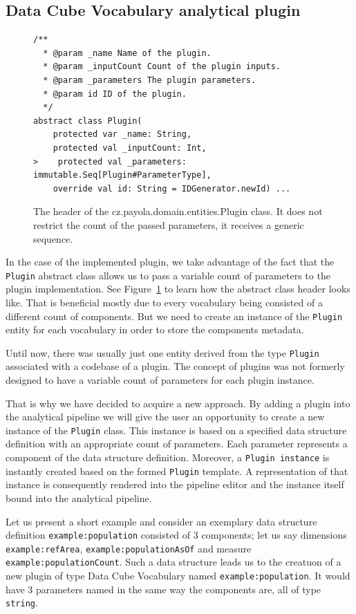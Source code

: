 \subsection{Data Cube Vocabulary analytical plugin}

\begin{figure}
  \begin{verbatim}
/**
  * @param _name Name of the plugin.
  * @param _inputCount Count of the plugin inputs.
  * @param _parameters The plugin parameters.
  * @param id ID of the plugin.
  */
abstract class Plugin(
    protected var _name: String,
    protected val _inputCount: Int,
>    protected val _parameters: immutable.Seq[Plugin#ParameterType],
    override val id: String = IDGenerator.newId) ...
  \end{verbatim}
  \label{fig:plugin-trait}
  \caption{The header of the cz.payola.domain.entities.Plugin class. It does not restrict the count
  of the passed parameters, it receives a generic sequence.}
\end{figure}

In the case of the implemented plugin, we take advantage of the fact that the 
\texttt{Plugin} abstract class allows us to pass a variable count of parameters to the 
plugin implementation. See Figure~\ref{fig:plugin-trait} to learn how the abstract class header 
looks like. That is beneficial mostly due to every vocabulary being consisted of a 
different count of components. But we need to create an instance of the \texttt{Plugin} entity
for each vocabulary in order to store the components metadata.

Until now, there was usually just one entity derived from the type \texttt{Plugin} associated with
a codebase of a plugin. The concept of plugins was not formerly designed to have
a variable count of parameters for each plugin instance.

That is why we have decided to acquire a new approach. By adding a plugin 
into the analytical pipeline we will give the user an opportunity to create a 
new instance of the \texttt{Plugin} class. This instance is based on a specified data structure definition
with an appropriate count of parameters. Each parameter represents a component 
of the data structure definition. Moreover, a \texttt{Plugin instance} is instantly created 
based on the formed \texttt{Plugin} template. A representation of that instance is consequently 
rendered into the pipeline editor and the instance itself bound into the 
analytical pipeline.

Let us present a short example and consider an exemplary data structure definition \texttt{example:population}
consisted of 3 
components; let us say dimensions \texttt{example:refArea}, \texttt{example:populationAsOf}
and measure \texttt{example:populationCount}. Such a data structure leads us to 
the creatuon of a new plugin of type Data Cube Vocabulary named 
\texttt{example:population}. It would have 3 parameters named in the same way the 
components are, all of type \texttt{string}.

